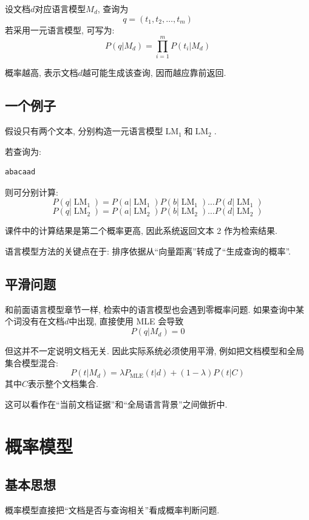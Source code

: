 设文档$d$对应语言模型$M_d$, 查询为
\[
q = (t_1, t_2, \dots, t_m)
\]
若采用一元语言模型, 可写为:
\[
P(q | M_d) = \prod_{i=1}^m P(t_i | M_d)
\]

概率越高, 表示文档$d$越可能生成该查询, 因而越应靠前返回.

\subsection{一个例子}


假设只有两个文本, 分别构造一元语言模型$\operatorname{LM}_1$和$\operatorname{LM}_2$.

若查询为:

\begin{Verbatim}[breaklines=true,breakanywhere=true,fontsize=\small]
abacaad
\end{Verbatim}

则可分别计算:
\[
P(q | \operatorname{LM}_1)
  = P(a|\operatorname{LM}_1) P(b|\operatorname{LM}_1) \dots P(d|\operatorname{LM}_1)
\]
\[
P(q | \operatorname{LM}_2)
  = P(a|\operatorname{LM}_2) P(b|\operatorname{LM}_2) \dots P(d|\operatorname{LM}_2)
\]

课件中的计算结果是第二个概率更高,
因此系统返回文本 2 作为检索结果.

语言模型方法的关键点在于:
排序依据从“向量距离”转成了“生成查询的概率”.

\subsection{平滑问题}


和前面语言模型章节一样, 检索中的语言模型也会遇到零概率问题.
如果查询中某个词没有在文档$d$中出现, 直接使用 MLE 会导致
\[
P(q | M_d) = 0
\]

但这并不一定说明文档无关.
因此实际系统必须使用平滑, 例如把文档模型和全局集合模型混合:
\[
P(t | M_d)
  = \lambda P_{\operatorname{MLE}}(t | d)
    + (1-\lambda) P(t | C)
\]
其中$C$表示整个文档集合.

这可以看作在“当前文档证据”和“全局语言背景”之间做折中.

\section{概率模型}


\subsection{基本思想}


概率模型直接把“文档是否与查询相关”看成概率判断问题.

